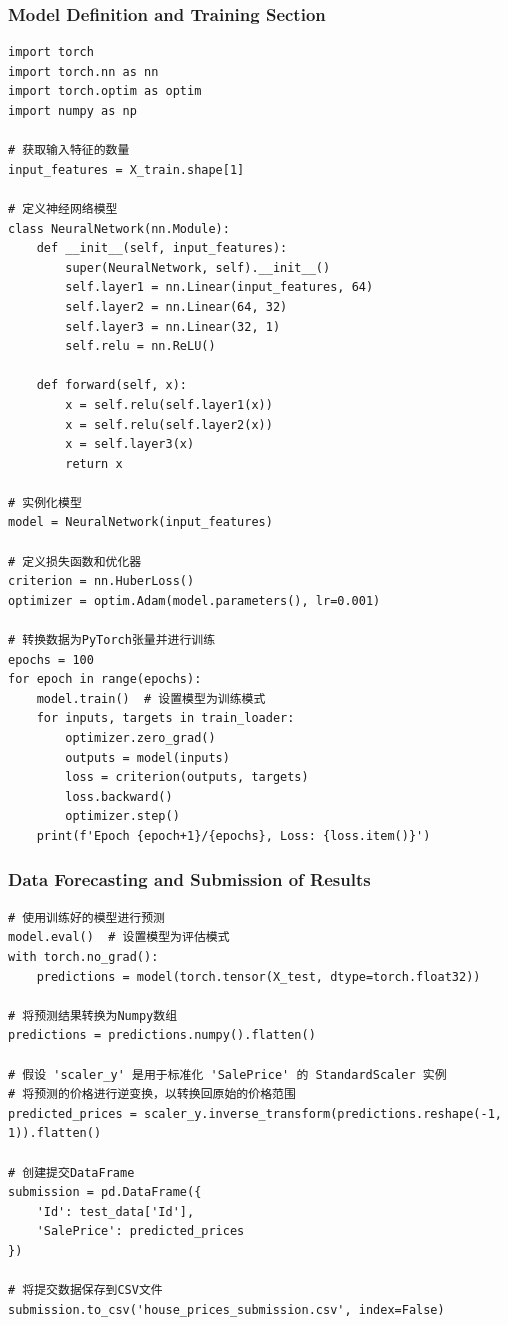 \documentclass[a4paper,12pt]{article}
\begin{document}
\subsubsection{Model Definition and Training Section}
\begin{lstlisting}
import torch
import torch.nn as nn
import torch.optim as optim
import numpy as np

# 获取输入特征的数量
input_features = X_train.shape[1]

# 定义神经网络模型
class NeuralNetwork(nn.Module):
    def __init__(self, input_features):
        super(NeuralNetwork, self).__init__()
        self.layer1 = nn.Linear(input_features, 64)
        self.layer2 = nn.Linear(64, 32)
        self.layer3 = nn.Linear(32, 1)
        self.relu = nn.ReLU()
    
    def forward(self, x):
        x = self.relu(self.layer1(x))
        x = self.relu(self.layer2(x))
        x = self.layer3(x)
        return x

# 实例化模型
model = NeuralNetwork(input_features)

# 定义损失函数和优化器
criterion = nn.HuberLoss()
optimizer = optim.Adam(model.parameters(), lr=0.001)

# 转换数据为PyTorch张量并进行训练
epochs = 100
for epoch in range(epochs):
    model.train()  # 设置模型为训练模式
    for inputs, targets in train_loader:
        optimizer.zero_grad()
        outputs = model(inputs)
        loss = criterion(outputs, targets)
        loss.backward()
        optimizer.step()
    print(f'Epoch {epoch+1}/{epochs}, Loss: {loss.item()}')

\end{lstlisting}

\subsubsection{Data Forecasting and Submission of Results}
\begin{lstlisting}
# 使用训练好的模型进行预测
model.eval()  # 设置模型为评估模式
with torch.no_grad():
    predictions = model(torch.tensor(X_test, dtype=torch.float32))

# 将预测结果转换为Numpy数组
predictions = predictions.numpy().flatten()

# 假设 'scaler_y' 是用于标准化 'SalePrice' 的 StandardScaler 实例
# 将预测的价格进行逆变换，以转换回原始的价格范围
predicted_prices = scaler_y.inverse_transform(predictions.reshape(-1, 1)).flatten()

# 创建提交DataFrame
submission = pd.DataFrame({
    'Id': test_data['Id'],
    'SalePrice': predicted_prices
})

# 将提交数据保存到CSV文件
submission.to_csv('house_prices_submission.csv', index=False)
\end{lstlisting}
\end{document}

